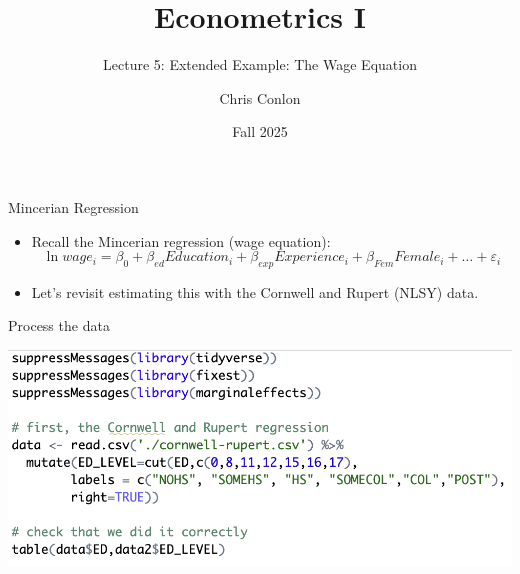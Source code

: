 






\title[L5-Wage Equation Example]{ Econometrics I}
\subtitle{Lecture 5: Extended Example: The Wage Equation}
\author{Chris Conlon}
\date{Fall 2025}
\maketitle






\begin{frame}{Mincerian Regression}
\begin{itemize}
	\item Recall the Mincerian regression (wage equation):\[
	\ln wage_i = \beta_0 + \beta_{ed} Education_i + \beta_{exp} Experience_i + \beta_{Fem} Female_i + \dots + \varepsilon_i
	\]

	\smallskip
	\item Let's revisit estimating this with the Cornwell and Rupert (NLSY) data. 
\end{itemize}
\end{frame}




\begin{frame}{Process the data}
\begin{center}
	\includegraphics [width=.9\textwidth]{code_0}\\
\end{center}
\end{frame}




